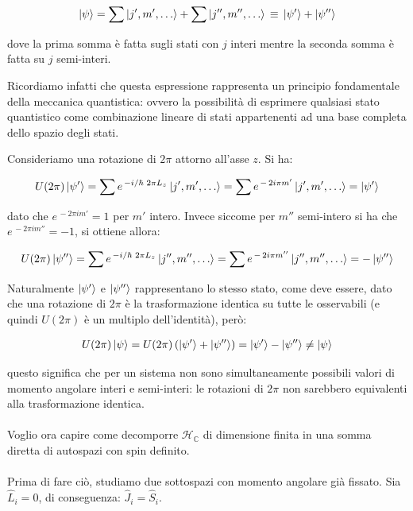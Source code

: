 \begin{align*}
	\ket{\psi} = \sum \ket{j', m', \ldots} + \sum \ket{j'', m'', \ldots} \, \equiv \, \ket{\psi'} + \ket{\psi''}
\end{align*}
	
	dove la prima somma è fatta sugli stati con $j$ interi mentre la seconda somma è fatta su $j$ semi-interi.
	
\begin{myapprf}
	Ricordiamo infatti che questa espressione rappresenta un principio fondamentale della meccanica quantistica: ovvero la possibilità di esprimere qualsiasi stato quantistico come combinazione lineare di stati appartenenti ad una base completa dello spazio degli stati.
\end{myapprf}
	
	 Consideriamo una rotazione di $2\pi$ attorno all'asse $z$. Si ha:
	
\begin{align*}
	U(2\pi) \ket{\psi'} = \sum e^{\, - i/\hbar \,\, 2\pi L_z} \ket{j', m', \ldots} = \sum  e^{\, -\, 2i\pi m'} \ket{j', m', \ldots} = \ket{\psi'}
\end{align*}

	dato che $e^{ \, -2\pi i m'} = 1$ per $m'$ intero. Invece siccome per $m''$ semi-intero si ha che $e^{ \, -2\pi i m''} = -1$, si ottiene allora:

\begin{align*}
	U(2\pi) \ket{\psi''} = \sum e^{\, - i/\hbar \,\, 2\pi L_z} \ket{j'', m'', \ldots} = \sum  e^{\, - \, 2i\pi m''} \ket{j'', m'', \ldots} = - \ket{\psi''}
\end{align*}

	Naturalmente $\ket{\psi'}$ e $\ket{\psi''}$ rappresentano lo stesso stato, come deve essere, dato che una rotazione di $2\pi$ è la trasformazione identica su tutte le osservabili (e quindi $U(2\pi)$ è un multiplo dell'identità), però:
	
\begin{align*}
	U(2\pi) \ket{\psi} = U(2\pi) \, \qty(\ket{\psi'} + \ket{\psi''}) = \ket{\psi'} - \ket{\psi''} \neq \ket{\psi} 
\end{align*}

	questo significa che per un sistema non sono simultaneamente possibili valori di momento angolare interi e semi-interi: le rotazioni di $2\pi$ non sarebbero equivalenti alla trasformazione identica.
	\\
	\\
	Voglio ora capire come decomporre $\mathcal{H}_{\mathbb{C}}$ di dimensione finita in una somma diretta di autospazi con spin definito.
	\\
	\\
	Prima di fare ciò, studiamo due sottospazi con momento angolare già fissato. Sia $\hat{L}_i = 0$, di conseguenza: $\hat{J}_i = \hat{S}_i$.

